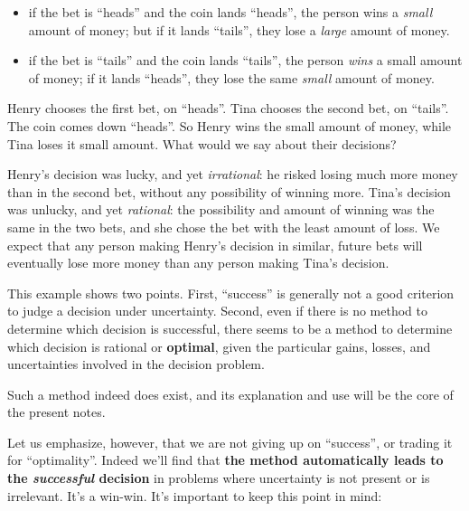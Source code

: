 \documentclass[
  a4paper,
  DIV=11,
  numbers=noendperiod,
  oneside]{scrreprt}
\providecommand{\tightlist}{%
  \setlength{\itemsep}{0pt}\setlength{\parskip}{0pt}}\usepackage{longtable,booktabs,array}
\begin{document}
\begin{itemize}
\tightlist
\item
  if the bet is ``heads'' and the coin lands ``heads'', the person wins
  a \emph{small} amount of money; but if it lands ``tails'', they lose a
  \emph{large} amount of money.
\item
  if the bet is ``tails'' and the coin lands ``tails'', the person
  \emph{wins} a small amount of money; if it lands ``heads'', they lose
  the same \emph{small} amount of money.
\end{itemize}

Henry chooses the first bet, on ``heads''. Tina chooses the second bet,
on ``tails''. The coin comes down ``heads''. So Henry wins the small
amount of money, while Tina loses it small amount. What would we say
about their decisions?

Henry's decision was lucky, and yet \emph{irrational}: he risked losing
much more money than in the second bet, without any possibility of
winning more. Tina's decision was unlucky, and yet \emph{rational}: the
possibility and amount of winning was the same in the two bets, and she
chose the bet with the least amount of loss. We expect that any person
making Henry's decision in similar, future bets will eventually lose
more money than any person making Tina's decision.

This example shows two points. First, ``success'' is generally not a
good criterion to judge a decision under uncertainty. Second, even if
there is no method to determine which decision is successful, there
seems to be a method to determine which decision is rational or
{\textbf{optimal}}, given the particular gains, losses, and
uncertainties involved in the decision problem.

Such a method indeed does exist, and its explanation and use will be the
core of the present notes.

Let us emphasize, however, that we are not giving up on ``success'', or
trading it for ``optimality''. Indeed we'll find that \textbf{the method
automatically leads to the \emph{successful} decision} in problems where
uncertainty is not present or is irrelevant. It's a win-win. It's
important to keep this point in mind:
\end{document}

